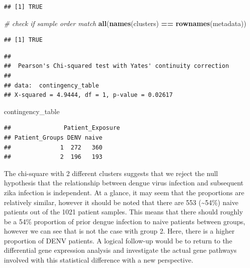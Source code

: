 \documentclass[
]{article}
\newenvironment{Shaded}{\begin{snugshade}}{\end{snugshade}}
\newcommand{\AttributeTok}[1]{\textcolor[rgb]{0.13,0.29,0.53}{#1}}
\newcommand{\CommentTok}[1]{\textcolor[rgb]{0.56,0.35,0.01}{\textit{#1}}}
\newcommand{\FunctionTok}[1]{\textcolor[rgb]{0.13,0.29,0.53}{\textbf{#1}}}
\newcommand{\NormalTok}[1]{#1}
\newcommand{\OtherTok}[1]{\textcolor[rgb]{0.56,0.35,0.01}{#1}}
\newcommand{\SpecialCharTok}[1]{\textcolor[rgb]{0.81,0.36,0.00}{\textbf{#1}}}
\begin{document}
\begin{verbatim}
## [1] TRUE
\end{verbatim}

\begin{Shaded}
\begin{Highlighting}[]
\CommentTok{\# check if sample order match}
\FunctionTok{all}\NormalTok{(}\FunctionTok{names}\NormalTok{(clusters) }\SpecialCharTok{==} \FunctionTok{rownames}\NormalTok{(metadata))}
\end{Highlighting}
\end{Shaded}

\begin{verbatim}
## [1] TRUE
\end{verbatim}

\begin{Shaded}
\end{Shaded}

\begin{verbatim}
## 
##  Pearson's Chi-squared test with Yates' continuity correction
## 
## data:  contingency_table
## X-squared = 4.9444, df = 1, p-value = 0.02617
\end{verbatim}

\begin{Shaded}
\begin{Highlighting}[]
\NormalTok{contingency\_table}
\end{Highlighting}
\end{Shaded}

\begin{verbatim}
##               Patient_Exposure
## Patient_Groups DENV naive
##              1  272   360
##              2  196   193
\end{verbatim}

The chi-square with 2 different clusters suggests that we reject the
null hypothesis that the relationship between dengue virus infection and
subsequent zika infection is independent. At a glance, it may seem that
the proportions are relatively similar, however it should be noted that
there are 553 (\textasciitilde54\%) naive patients out of the 1021
patient samples. This means that there should roughly be a 54\%
proportion of prior dengue infection to naive patients between groups,
however we can see that is not the case with group 2. Here, there is a
higher proportion of DENV patients. A logical follow-up would be to
return to the differential gene expression analysis and investigate the
actual gene pathways involved with this statistical difference with a
new perspective.\\
\end{document}

